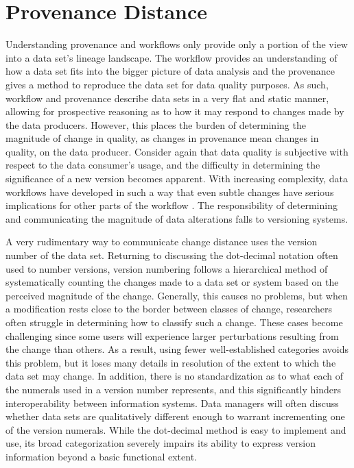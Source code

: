 \section{Provenance Distance}

Understanding provenance and workflows only provide only a portion of the view into a data set's lineage landscape.
The workflow provides an understanding of how a data set fits into the bigger picture of data analysis and the provenance gives a method to reproduce the data set for data quality purposes.
As such, workflow and provenance describe data sets in a very flat and static manner, allowing for prospective reasoning as to how it may respond to changes made by the data producers.
However, this places the burden of determining the magnitude of change in quality, as changes in provenance mean changes in quality, on the data producer.
Consider again that data quality is subjective with respect to the data consumer's usage, and the difficulty in determining the significance of a new version becomes apparent.
With increasing complexity, data workflows have developed in such a way that even subtle changes have serious implications for other parts of the workflow \cite{TILMES2011548}.
The responsibility of determining and communicating the magnitude of data alterations falls to versioning systems.

A very rudimentary way to communicate change distance uses the version number of the data set.
Returning to discussing the dot-decimal notation often used to number versions, version numbering follows a hierarchical method of systematically counting the changes made to a data set or system based on the perceived magnitude of the change.
Generally, this causes no problems, but when a modification rests close to the border between classes of change, researchers often struggle in determining how to classify such a change.
These cases become challenging since some users will experience larger perturbations resulting from the change than others.
As a result, using fewer well-established categories avoids this problem, but it loses many details in resolution of the extent to which the data set may change.
In addition, there is no standardization as to what each of the numerals used in a version number represents, and this significantly hinders interoperability between information systems.
Data managers will often discuss whether data sets are qualitatively different enough to warrant incrementing one of the version numerals.
While the dot-decimal method is easy to implement and use, its broad categorization severely impairs its ability to express version information beyond a basic functional extent.


